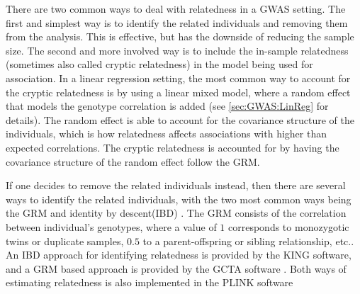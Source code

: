 There are two common ways to deal with relatedness in a GWAS setting. The first and simplest way is to identify the related individuals and removing them from the analysis. This is effective, but has the downside of reducing the sample size. The second and more involved way is to include the in-sample relatedness (sometimes also called cryptic relatedness) in the model being used for association. In a linear regression setting, the most common way to account for the cryptic relatedness is by using a linear mixed model, where a random effect that models the genotype correlation is added (see \cref{sec:GWAS:LinReg} for details). The random effect is able to account for the covariance structure of the individuals, which is how relatedness affects associations with higher than expected correlations\cite{yu2006unified, kang2008efficient}. The cryptic relatedness is accounted for by having the covariance structure of the random effect follow the GRM.

If one decides to remove the related individuals instead, then there are several ways to identify the related individuals, with the two most common ways being the GRM and identity by descent(IBD) \cite{yang2011gcta,chang2015second,purcell2007plink,manichaikul2010robust}. The GRM consists of the correlation between individual's genotypes, where a value of $ 1 $ corresponds to monozygotic twins or duplicate samples, $ 0.5 $ to a parent-offspring or sibling relationship, etc.. %
An IBD approach for identifying relatedness is provided by the KING software\cite{manichaikul2010robust}, and a GRM based approach is provided by the GCTA software \cite{yang2011gcta}. Both ways of estimating relatedness is also implemented in the PLINK software\cite{chang2015second,purcell2007plink}


